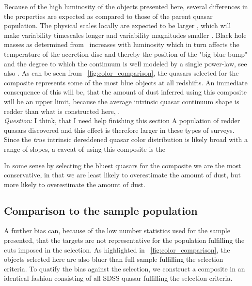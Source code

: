 \documentclass{aa}    %
\newcommand{\figref}[1]{\ref{fig:#1}}
\newcommand{\Fig}[1]{\figurename~\figref{#1}}
\newcommand{\fig}[1]{\Fig{#1}}
\newcommand{\sectlabel}[1]{\label{sect:#1}}
\newcommand{\mgii}{\ion{Mg}{ii}}
\newcommand{\todo}[3]{{\color{#2}\emph{#1}: #3}}
\newcommand{\qtodo}[1]{\todo{\\ Question}{red}{#1}}
\begin{document}
Because of the high luminosity of the objects presented here, several differences in the properties are expected as compared to those of the parent quasar population. The physical scales locally are expected to be larger \citep{Bentz2013}, which will make variability timescales longer and variability magnitudes smaller \citep{VandenBerk2004}. Black hole masses as determined from \mgii~increases with luminosity \cite{wu2015} which in turn affects the temperature of the accretion disc \citep{shakura1973} and thereby the position of the "big blue bump" and the degree to which the continuum is well modeled by a single power-law, see also \cite{Lusso2015}. As can be seen from \fig{color_comparison}, the quasars selected for the composite represents some of the most blue objects at all redshifts. An immediate consequence of this will be, that the amount of dust inferred using this composite will be an upper limit, because the average intrinsic quasar continuum shape is redder than what is constructed here, \citep{Richards2003, Hopkins2004a}. \qtodo{I think, that I need help finishing this section}
 A population of redder quasars discovered \cite{Glikman2012} and this effect is therefore larger in these types of surveys. 
Since the \textit{true} intrinsic dereddened quasar color distribution is likely broad with a range of slopes, a caveat of using this composite is the 

In some sense by selecting the bluest quasars for the composite we are the most conservative, in that we are least likely to overestimate the amount of dust, but more likely to overestimate the amount of dust. 



\subsection{Comparison to the sample population}  \sectlabel{sample_pop}



A further bias can, because of the low number statistics used for the sample presented, that the targets are not representative for the population fulfilling the cuts imposed in the selection. As highlighted in \fig{color_comparison}, the objects selected here are also bluer than full sample fulfilling the selection criteria. To quatify the bias against the selection, we construct a composite in an identical fashion consisting of all SDSS quasar fulfilling the selection criteria. 
\end{document}
